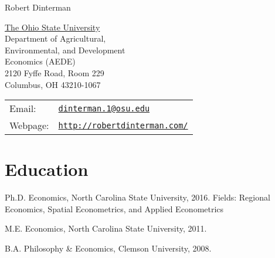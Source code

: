 \documentclass[letterpaper]{article}
\def\name{Robert Dinterman}
\renewenvironment{itemize}{
  \begin{list}{}{
    \setlength{\leftmargin}{1.5em}
  }
}{
  \end{list}
}
\begin{document}
{\huge \name}


\vspace{0.25in}

\begin{minipage}{0.45\linewidth}
  \href{http://aede.osu.edu/home}{The Ohio State University} \\
  Department of Agricultural, \\
  Environmental, and Development \\
  Economics (AEDE) \\
  2120 Fyffe Road, Room 229 \\
  Columbus, OH 43210-1067
\end{minipage}
\begin{minipage}{0.5\linewidth}
  \begin{tabular}{ll}
    Email: & \href{mailto:dinterman.1@osu.edu}{\tt dinterman.1@osu.edu} \\
    Webpage: & \href{http://robertdinterman.com/}{\tt http://robertdinterman.com/} \\
  \end{tabular}
\end{minipage}


% 
% 

\section*{Education}

\begin{itemize}
  \item Ph.D. Economics, North Carolina State University, 2016.
    \subitem Fields: Regional Economics, Spatial Econometrics, and Applied Econometrics

  \item M.E. Economics, North Carolina State University, 2011.

  \item B.A. Philosophy \& Economics, Clemson University, 2008.
\end{itemize}
\end{document}
